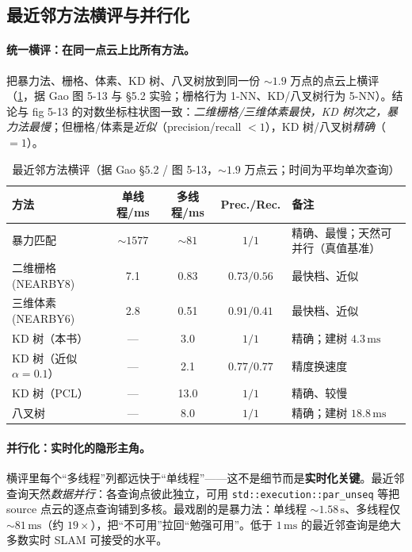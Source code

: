 \subsection{最近邻方法横评与并行化}
\label{sec:pc-nn-bench}

\paragraph{统一横评：在同一点云上比所有方法。}
把暴力法、栅格、体素、KD 树、八叉树放到同一份 $\sim1.9$ 万点的点云上横评（\cref{tab:pc-nn-bench}，据 Gao 图 5-13 与 §5.2 实验；栅格行为 1-NN、KD/八叉树行为 5-NN）。结论与 fig 5-13 的对数坐标柱状图一致：\emph{二维栅格/三维体素最快，KD 树次之，暴力法最慢}；但栅格/体素是\emph{近似}（precision/recall $<1$），KD 树/八叉树\emph{精确}（$=1$）。

\begin{table}[H]\centering\small
\caption{最近邻方法横评（据 Gao §5.2 / 图 5-13，$\sim1.9$ 万点云；时间为平均单次查询）}
\label{tab:pc-nn-bench}
\begin{tabular}{l c c c l}
\toprule
方法 & 单线程/ms & 多线程/ms & Prec./Rec. & 备注 \\
\midrule
暴力匹配 & $\sim1577$ & $\sim81$ & $1/1$ & 精确、最慢；天然可并行（真值基准） \\
二维栅格(NEARBY8) & 7.1 & 0.83 & $0.73/0.56$ & 最快档、近似 \\
三维体素(NEARBY6) & 2.8 & 0.51 & $0.91/0.41$ & 最快档、近似 \\
KD 树（本书） & --- & 3.0 & $1/1$ & 精确；建树 $4.3\,\mathrm{ms}$ \\
KD 树（近似 $\alpha{=}0.1$） & --- & 2.1 & $0.77/0.77$ & 精度换速度 \\
KD 树（PCL） & --- & 13.0 & $1/1$ & 精确、较慢 \\
八叉树 & --- & 8.0 & $1/1$ & 精确；建树 $18.8\,\mathrm{ms}$ \\
\bottomrule
\end{tabular}
\end{table}

\paragraph{并行化：实时化的隐形主角。}
横评里每个“多线程”列都远快于“单线程”——这不是细节而是\textbf{实时化关键}。最近邻查询天然\emph{数据并行}：各查询点彼此独立，可用 \texttt{std::execution::par\_unseq} 等把 source 点云的逐点查询铺到多核。最戏剧的是暴力法：单线程 $\sim1.58\,\mathrm{s}$、多线程仅 $\sim81\,\mathrm{ms}$（约 $19\times$），把“不可用”拉回“勉强可用”。低于 $1\,\mathrm{ms}$ 的最近邻查询是绝大多数实时 SLAM 可接受的水平。

